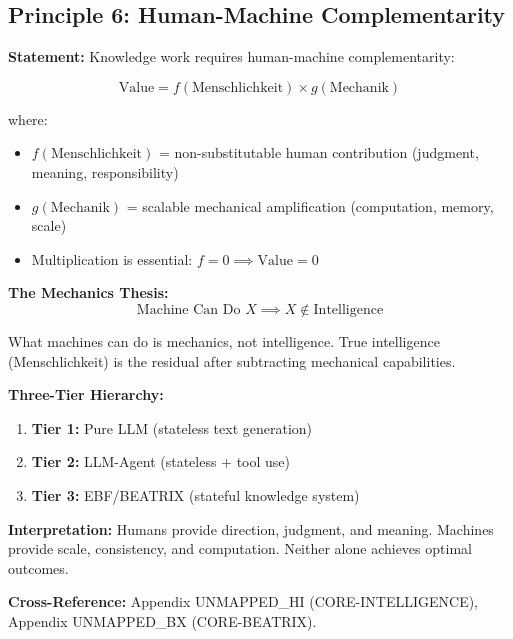 \subsection{Principle 6: Human-Machine Complementarity}

\begin{tcolorbox}[colback=gray!5!white, colframe=gray!75!black,
    title=Axiom UNMAPPED_PR-6: The Autor-Fehr Synthesis]

\textbf{Statement:} Knowledge work requires human-machine complementarity:

\begin{equation}
\boxed{\text{Value} = f(\text{Menschlichkeit}) \times g(\text{Mechanik})}
\label{eq:pr-autor-fehr}
\end{equation}

where:
\begin{itemize}[nosep]
    \item $f(\text{Menschlichkeit})$ = non-substitutable human contribution (judgment, meaning, responsibility)
    \item $g(\text{Mechanik})$ = scalable mechanical amplification (computation, memory, scale)
    \item Multiplication is essential: $f = 0 \implies \text{Value} = 0$
\end{itemize}

\textbf{The Mechanics Thesis:}
\begin{equation}
\text{Machine Can Do } X \implies X \notin \text{Intelligence}
\end{equation}

What machines can do is mechanics, not intelligence. True intelligence (Menschlichkeit) is the residual after subtracting mechanical capabilities.

\textbf{Three-Tier Hierarchy:}
\begin{enumerate}
    \item \textbf{Tier 1:} Pure LLM (stateless text generation)
    \item \textbf{Tier 2:} LLM-Agent (stateless + tool use)
    \item \textbf{Tier 3:} EBF/BEATRIX (stateful knowledge system)
\end{enumerate}

\textbf{Interpretation:} Humans provide direction, judgment, and meaning. Machines provide scale, consistency, and computation. Neither alone achieves optimal outcomes.

\textbf{Cross-Reference:} Appendix UNMAPPED_HI (CORE-INTELLIGENCE), Appendix UNMAPPED_BX (CORE-BEATRIX).

\end{tcolorbox}


